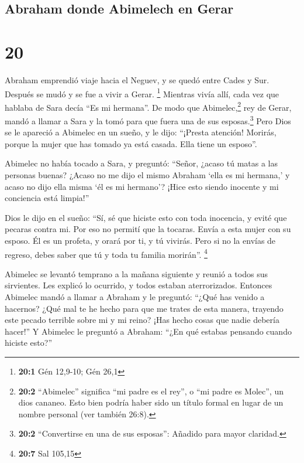 \hypertarget{abraham-donde-abimelech-en-gerar}{%
\subsection{Abraham donde Abimelech en
Gerar}\label{abraham-donde-abimelech-en-gerar}}

\hypertarget{section-19}{%
\section{20}\label{section-19}}

 Abraham emprendió viaje hacia el Neguev, y se quedó entre
Cades y Sur. Después se mudó y se fue a vivir a Gerar. \footnote{\textbf{20:1}
  Gén 12,9-10; Gén 26,1}  Mientras vivía allí, cada vez
que hablaba de Sara decía ``Es mi hermana''. De modo que
Abimelec,\footnote{\textbf{20:2} ``Abimelec'' significa ``mi padre es el
  rey'', o ``mi padre es Molec'', un dios cananeo. Esto bien podría
  haber sido un título formal en lugar de un nombre personal (ver
  también 26:8).} rey de Gerar, mandó a llamar a Sara y la tomó para que
fuera una de sus esposas.\footnote{\textbf{20:2} ``Convertirse en una de
  sus esposas'': Añadido para mayor claridad.}  Pero Dios
se le apareció a Abimelec en un sueño, y le dijo: ``¡Presta atención!
Morirás, porque la mujer que has tomado ya está casada. Ella tiene un
esposo''.

 Abimelec no había tocado a Sara, y preguntó: ``Señor,
¿acaso tú matas a las personas buenas?  ¿Acaso no me dijo
el mismo Abraham `ella es mi hermana,' y acaso no dijo ella misma `él es
mi hermano'? ¡Hice esto siendo inocente y mi conciencia está limpia!''

 Dios le dijo en el sueño: ``Sí, sé que hiciste esto con
toda inocencia, y evité que pecaras contra mi. Por eso no permití que la
tocaras.  Envía a esta mujer con su esposo. Él es un
profeta, y orará por ti, y tú vivirás. Pero si no la envías de regreso,
debes saber que tú y toda tu familia morirán''. \footnote{\textbf{20:7}
  Sal 105,15}

 Abimelec se levantó temprano a la mañana siguiente y
reunió a todos sus sirvientes. Les explicó lo ocurrido, y todos estaban
aterrorizados.  Entonces Abimelec mandó a llamar a Abraham
y le preguntó: ``¿Qué has venido a hacernos? ¿Qué mal te he hecho para
que me trates de esta manera, trayendo este pecado terrible sobre mi y
mi reino? ¡Has hecho cosas que nadie debería hacer!''  Y
Abimelec le preguntó a Abraham: ``¿En qué estabas pensando cuando
hiciste esto?''

